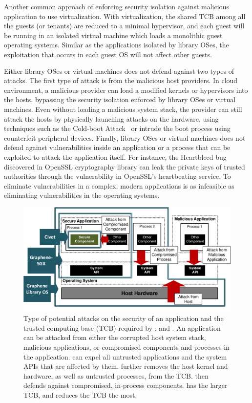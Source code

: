 Another common approach of enforcing security isolation against malicious application to use virtualization.
With virtualization, the shared TCB among all the guests (or tenants)
are reduced to a minimal hypervisor,
and each guest will be running in an isolated virtual machine which loads a monolithic guest operating systems.
Similar as the applications isolated by library OSes, the exploitation that occurs in each guest OS will not affect other guests.

Either library OSes or virtual machines does not defend against two types of attacks.
The first type of attack is from the malicious host providers.
In cloud environment, a malicious provider can load a modified kernels or hypervisors into the hosts,
bypassing the security isolation enforced by library OSes or virtual machines.
Even without loading a malicious system stack,
the provider can still attack the hosts by physically launching attacks on the hardware, using techniques such as the Cold-boot Attack~\citep{halderman09coldboot} or 
intrude the boot process using counterfeit peripheral devices.
Finally, library OSes or virtual machines does not defend against vulnerabilities
inside an application or a process
that can be exploited to attack the application itself.
For instance, the Heartbleed bug~\citep{heartbleed} discovered in OpenSSL cryptography library
can leak the private keys of trusted authorities through the vulnerability in OpenSSL's heartbeating service.
To eliminate vulnerabilities in a complex, modern applications is as infeasible as eliminating vulnerabilities in the operating systems.

\begin{figure}[t!]
\centering
\includegraphics[width=4.5in]{figures/defense.pdf}
\caption[Types of potential attacks on an application, and the TCB required by \graphene{}, \gsgx{} and \civet{}]
{Type of potential attacks on the security of an application and the trusted computing base (TCB) required by \graphene{}, \gsgx{} and \civet{}.
An application can be attacked from either the corrupted host system stack, malicious applications, or compromised components and processes in the application.
\graphene{} can expel all untrusted applications and the system APIs that are affected by them.
\gsgx{} further removes the host kernel and hardware, as well as untrusted processes, from the TCB. \civet{} then defends against compromised, in-process components. \graphene{} has the larger TCB, and \civet{} reduces the TCB the most.}
\label{fig:defense}
\end{figure}

